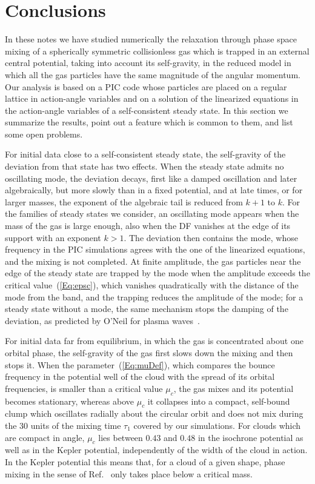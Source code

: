 \section{Conclusions}
\label{Sec:Conclusions}

In these notes we have studied numerically the relaxation through phase space mixing of a spherically symmetric collisionless gas which is trapped in an external central potential, taking into account its self-gravity, in the reduced model in which all the gas particles have the same magnitude of the angular momentum. Our analysis is based on a PIC code whose particles are placed on a regular lattice in action-angle variables and on a solution of the linearized equations in the action-angle variables of a self-consistent steady state. In this section we summarize the results, point out a feature which is common to them, and list some open problems.

For initial data close to a self-consistent steady state, the self-gravity of the deviation from that state has two effects. When the steady state admits no oscillating mode, the deviation decays, first like a damped oscillation and later algebraically, but more slowly than in a fixed potential, and at late times, or for larger masses, the exponent of the algebraic tail is reduced from $k + 1$ to $k$. For the families of steady states we consider, an oscillating mode appears when the mass of the gas is large enough, also when the DF vanishes at the edge of its support with an exponent $k > 1$. The deviation then contains the mode, whose frequency in the PIC simulations agrees with the one of the linearized equations, and the mixing is not completed. At finite amplitude, the gas particles near the edge of the steady state are trapped by the mode when the amplitude exceeds the critical value~(\ref{Eq:epsc}), which vanishes quadratically with the distance of the mode from the band, and the trapping reduces the amplitude of the mode; for a steady state without a mode, the same mechanism stops the damping of the deviation, as predicted by O'Neil for plasma waves~\cite{tO65}.

For initial data far from equilibrium, in which the gas is concentrated about one orbital phase, the self-gravity of the gas first slows down the mixing and then stops it. When the parameter~(\ref{Eq:muDef}), which compares the bounce frequency in the potential well of the cloud with the spread of its orbital frequencies, is smaller than a critical value $\mu_c$, the gas mixes and its potential becomes stationary, whereas above $\mu_c$ it collapses into a compact, self-bound clump which oscillates radially about the circular orbit and does not mix during the $30$ units of the mixing time $\tau_1$ covered by our simulations. For clouds which are compact in angle, $\mu_c$ lies between $0.43$ and $0.48$ in the isochrone potential as well as in the Kepler potential, independently of the width of the cloud in action. In the Kepler potential this means that, for a cloud of a given shape, phase mixing in the sense of Ref.~\cite{sCjL26} only takes place below a critical mass.

